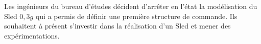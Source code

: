 Les ingénieurs du bureau d'études décident d'arrêter en l'état la modélisation du Sled $0,3 g$ qui a permis de définir une première structure de commande. Ils souhaitent à présent s'investir dans la réalisation d'un Sled et mener des expérimentations.
